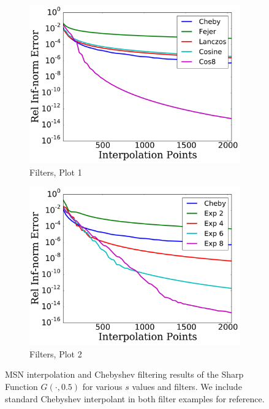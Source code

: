 \begin{figure}[p]
    \begin{subfigure}{0.45\textwidth}
    \includegraphics[width=\textwidth]{plots/cheby_interp_filter_rough_sharp_func.pdf}
    \caption{Filters, Plot 1}
    \end{subfigure}
    \begin{subfigure}{0.45\textwidth}
    \includegraphics[width=\textwidth]{plots/cheby_interp_filter_2_rough_sharp_func.pdf}
    \caption{Filters, Plot 2}
    \end{subfigure}
\caption[Rough Interpolation Comparison: Sharp Function]{
MSN interpolation and Chebyshev filtering results of the Sharp Function
$G(\cdot,0.5)$ for various $s$ values and filters.
We include standard Chebyshev interpolant in both filter examples for reference.
}
\label{fig:rough_comparison_sharp_func}
\end{figure}



